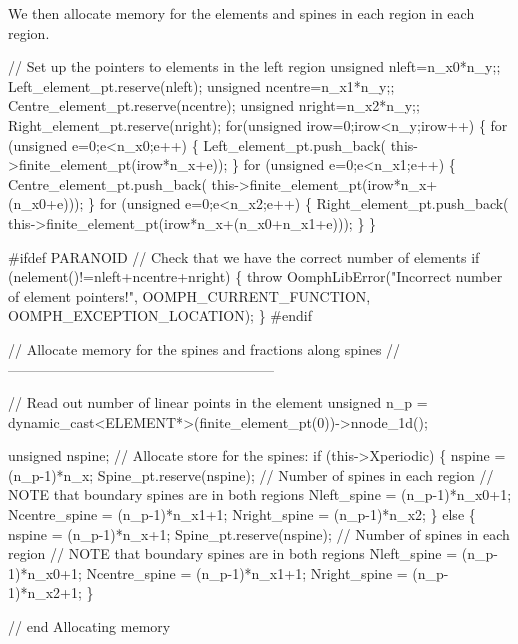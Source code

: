 We then allocate memory for the elements and spines in each region in each region.


\begin{DoxyCodeInclude}

 \textcolor{comment}{// Set up the pointers to elements in the left region}
 \textcolor{keywordtype}{unsigned} nleft=n\_x0*n\_y;;
 Left\_element\_pt.reserve(nleft);
 \textcolor{keywordtype}{unsigned} ncentre=n\_x1*n\_y;;
 Centre\_element\_pt.reserve(ncentre);
 \textcolor{keywordtype}{unsigned} nright=n\_x2*n\_y;;
 Right\_element\_pt.reserve(nright); 
 \textcolor{keywordflow}{for}(\textcolor{keywordtype}{unsigned} irow=0;irow<n\_y;irow++)
  \{
   \textcolor{keywordflow}{for} (\textcolor{keywordtype}{unsigned} e=0;e<n\_x0;e++)
    \{
     Left\_element\_pt.push\_back(
      this->finite\_element\_pt(irow*n\_x+e));
    \}
   \textcolor{keywordflow}{for} (\textcolor{keywordtype}{unsigned} e=0;e<n\_x1;e++)
    \{
     Centre\_element\_pt.push\_back(
      this->finite\_element\_pt(irow*n\_x+(n\_x0+e)));
    \}
   \textcolor{keywordflow}{for} (\textcolor{keywordtype}{unsigned} e=0;e<n\_x2;e++)
    \{
     Right\_element\_pt.push\_back(
      this->finite\_element\_pt(irow*n\_x+(n\_x0+n\_x1+e)));
    \}
  \}
 
\textcolor{preprocessor}{#ifdef PARANOID}
 \textcolor{comment}{// Check that we have the correct number of elements}
 \textcolor{keywordflow}{if} (nelement()!=nleft+ncentre+nright)
  \{
   \textcolor{keywordflow}{throw} OomphLibError(\textcolor{stringliteral}{"Incorrect number of element pointers!"},
                       OOMPH\_CURRENT\_FUNCTION,
                       OOMPH\_EXCEPTION\_LOCATION);
  \}
\textcolor{preprocessor}{#endif}

 \textcolor{comment}{// Allocate memory for the spines and fractions along spines}
 \textcolor{comment}{//---------------------------------------------------------}

 \textcolor{comment}{// Read out number of linear points in the element}
 \textcolor{keywordtype}{unsigned} n\_p = \textcolor{keyword}{dynamic\_cast<}ELEMENT*\textcolor{keyword}{>}(finite\_element\_pt(0))->nnode\_1d();
 
 \textcolor{keywordtype}{unsigned} nspine;
 \textcolor{comment}{// Allocate store for the spines:}
 \textcolor{keywordflow}{if} (this->Xperiodic)
  \{
   nspine = (n\_p-1)*n\_x;
   Spine\_pt.reserve(nspine);
   \textcolor{comment}{// Number of spines in each region}
   \textcolor{comment}{// NOTE that boundary spines are in both regions}
   Nleft\_spine = (n\_p-1)*n\_x0+1;
   Ncentre\_spine = (n\_p-1)*n\_x1+1;
   Nright\_spine = (n\_p-1)*n\_x2;
  \}
 \textcolor{keywordflow}{else}
  \{
   nspine = (n\_p-1)*n\_x+1;
   Spine\_pt.reserve(nspine);
   \textcolor{comment}{// Number of spines in each region}
   \textcolor{comment}{// NOTE that boundary spines are in both regions}
   Nleft\_spine = (n\_p-1)*n\_x0+1;
   Ncentre\_spine = (n\_p-1)*n\_x1+1;
   Nright\_spine = (n\_p-1)*n\_x2+1;
  \}

 \textcolor{comment}{// end Allocating memory}

\end{DoxyCodeInclude}


